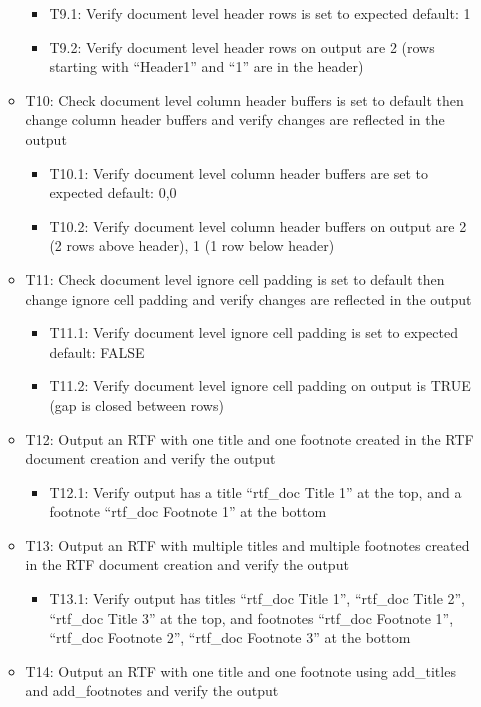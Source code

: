 \documentclass[]{article}
\providecommand{\tightlist}{%
  \setlength{\itemsep}{0pt}\setlength{\parskip}{0pt}}
\begin{document}
\begin{itemize}
\begin{itemize}
    \begin{itemize}
    \tightlist
    \item
      T9.1: Verify document level header rows is set to expected
      default: 1
    \item
      T9.2: Verify document level header rows on output are 2 (rows
      starting with ``Header1'' and ``1'' are in the header)
    \end{itemize}
  \item
    T10: Check document level column header buffers is set to default
    then change column header buffers and verify changes are reflected
    in the output

    \begin{itemize}
    \tightlist
    \item
      T10.1: Verify document level column header buffers are set to
      expected default: 0,0
    \item
      T10.2: Verify document level column header buffers on output are 2
      (2 rows above header), 1 (1 row below header)
    \end{itemize}
  \item
    T11: Check document level ignore cell padding is set to default then
    change ignore cell padding and verify changes are reflected in the
    output

    \begin{itemize}
    \tightlist
    \item
      T11.1: Verify document level ignore cell padding is set to
      expected default: FALSE
    \item
      T11.2: Verify document level ignore cell padding on output is TRUE
      (gap is closed between rows)
    \end{itemize}
  \item
    T12: Output an RTF with one title and one footnote created in the
    RTF document creation and verify the output

    \begin{itemize}
    \tightlist
    \item
      T12.1: Verify output has a title ``rtf\_doc Title 1'' at the top,
      and a footnote ``rtf\_doc Footnote 1'' at the bottom
    \end{itemize}
  \item
    T13: Output an RTF with multiple titles and multiple footnotes
    created in the RTF document creation and verify the output

    \begin{itemize}
    \tightlist
    \item
      T13.1: Verify output has titles ``rtf\_doc Title 1'', ``rtf\_doc
      Title 2'', ``rtf\_doc Title 3'' at the top, and footnotes
      ``rtf\_doc Footnote 1'', ``rtf\_doc Footnote 2'', ``rtf\_doc
      Footnote 3'' at the bottom
    \end{itemize}
  \item
    T14: Output an RTF with one title and one footnote using add\_titles
    and add\_footnotes and verify the output


\end{itemize}
\end{itemize}
\end{document}
